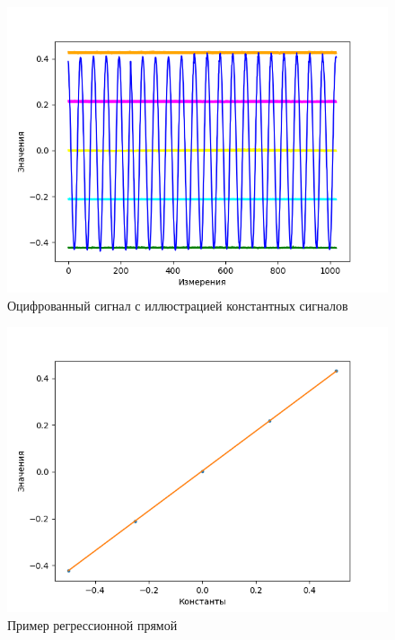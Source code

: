 \documentclass[12pt,a4paper]{article}
\begin{document}
\begin{figure}[H]
    \centering
    \includegraphics[scale=0.8]{images/signal_in_levels.png}
    \caption{Оцифрованный сигнал с иллюстрацией константных сигналов}
\end{figure}

\begin{figure}[H]
    \centering
    \includegraphics[scale=0.8]{images/regression.png}
    \caption{Пример регрессионной прямой}
\end{figure}
\end{document}
